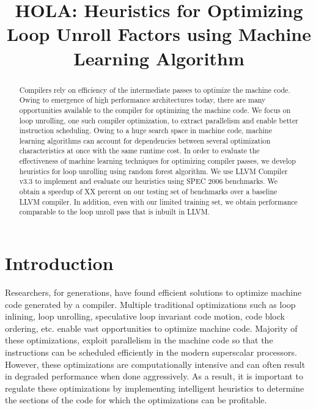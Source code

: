 \documentclass[]{sig-alternate}
\begin{document}
\title{HOLA: Heuristics for Optimizing Loop Unroll Factors using Machine Learning Algorithm\\\vspace{-4mm}}
\makeatletter
\def\@copyrightspace{\relax}
\makeatother

\maketitle

\begin{abstract}
Compilers rely on efficiency of the intermediate passes to optimize the machine code. Owing to emergence of high performance architectures today, there are many opportunities available to the compiler for optimizing the machine code. We focus on loop unrolling, one such compiler optimization, to extract parallelism and enable better instruction scheduling. Owing to a huge search space in machine code, machine learning algorithms can account for dependencies between several optimization characteristics at once with the same runtime cost. In order to evaluate the effectiveness of machine learning techniques for optimizing compiler passes, we develop heuristics for loop unrolling using random forest algorithm.  We use LLVM Compiler v3.3 to implement and evaluate our heuristics using SPEC 2006 benchmarks. We obtain a speedup of XX percent on our testing set of benchmarks over a baseline LLVM compiler. In addition, even with our limited training set, we obtain performance comparable to the loop unroll pass that is inbuilt in LLVM.
\end{abstract}

\section{Introduction}\label{sec:intro}
Researchers, for generations, have found efficient solutions to optimize machine code generated by a compiler. Multiple traditional optimizations such as loop inlining, loop unrolling, speculative loop invariant code motion, code block ordering, etc. enable vast opportunities to optimize machine code. Majority of these optimizations, exploit parallelism in the machine code so that the instructions can be scheduled efficiently in the modern superscalar processors. However, these optimizations are computationally intensive and can often result in degraded performance when done aggressively. As a result, it is important to regulate these optimizations by implementing intelligent heuristics to determine the sections of the code for which the optimizations can be profitable.
\end{document}
